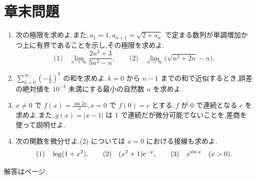 \section*{章末問題}
\begin{enumerate}[label=\textbf{\thechapter.\arabic*},leftmargin=*]

 \item\label{問:極限と漸化式} 次の極限を求めよ.また,\,$a_1=1$,\,$a_{n+1}=\sqrt{2+a_n}$ で定まる数列が単調増加かつ上に有界であることを示し,その極限を求めよ.
 \[
  \text{(1)}\quad\lim_{n\to\infty}\frac{2n^2+3}{5n^2-n},
  \qquad
  \text{(2)}\quad\lim_{n\to\infty}\bigl(\sqrt{n^2+2n}-n\bigr).
 \]
 \item\label{問:等比誤差} $\sum_{k=0}^{\infty}\left(-\frac12\right)^k$ の和を求めよ.\,$k=0$ から $n-1$ までの和で近似するとき,誤差の絶対値を $10^{-3}$ 未満にする最小の自然数 $n$ を求めよ.
 \item\label{問:連続と微分可能} $x\ne0$ で $f(x)=\frac{\sin2x}{x}$,\,$x=0$ で $f(0)=c$ とする.\,$f$ が $0$ で連続となる $c$ を求めよ.また,\,$g(x)=|x-1|$ は $1$ で連続だが微分可能でないことを,差商を使って説明せよ.
 \item\label{問:微分計算} 次の関数を微分せよ.(2) については $x=0$ における接線も求めよ.
 \[
  \text{(1)}\quad\log(1+x^2),\qquad
  \text{(2)}\quad(x^2+1)\mathrm{e}^{-x},\qquad
  \text{(3)}\quad x^{\sin x}\quad(x>0).
 \]\end{enumerate}
\smallskip\noindent 解答は\pageref{解答:第2章}ページ.
